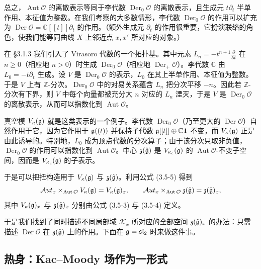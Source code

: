 总之，$\operatorname{Aut}\mathcal{O}$ 的离散表示等同于李代数 $\operatorname{Der}_0\mathcal{O}$ 的离散表示，且生成元 $t\partial_t$ 半单作用、本征值为整数。在我们考察的大多数情形，李代数 $\operatorname{Der}_0\mathcal{O}$ 的作用可以扩充为 $\operatorname{Der}\mathcal{O}=\mathbb{C}[[t]]\partial_t$ 的作用。（额外生成元 $\partial_t$ 的作用很重要，它扮演联络的角色，使我们能等同曲线 $X$ 上邻近点 $x,x'$ 所对应的对象。）

在 §3.1.3 我们引入了 Virasoro 代数的一个拓扑基。其中元素 $L_n=-t^{n+1}\frac{\partial}{\partial t}$ 在 $n\ge 0$（相应地 $n>0$）时生成 $\operatorname{Der}_0\mathcal{O}$（相应地 $\operatorname{Der}_+\mathcal{O}$）。李代数 $\mathbb{C}$ 由 $L_0=-t\partial_t$ 生成。设 $V$ 是 $\operatorname{Der}_0\mathcal{O}$ 的表示，$L_0$ 在其上半单作用、本征值为整数。于是 $V$ 上有 $\mathbb{Z}$-分次。$\operatorname{Der}_0\mathcal{O}$ 中的对易关系蕴含 $L_n$ 把分次平移 $-n$。因此若 $\mathbb{Z}$-分次有下界，则 $V$ 中每个向量都被充分大 $n$ 对应的 $L_n$ 湮灭，于是 $V$ 是 $\operatorname{Der}_0\mathcal{O}$ 的离散表示，从而可以指数化到 $\operatorname{Aut}\mathcal{O}$。

真空模 $V_\kappa(\mathfrak{g})$ 就是这类表示的一个例子。李代数 $\operatorname{Der}_0\mathcal{O}$（乃至更大的 $\operatorname{Der}\mathcal{O}$）自然作用于它，因为它作用于 $\mathfrak{g}((t))$ 并保持子代数 $\mathfrak{g}[[t]]\oplus\mathbb{C}\mathbf{1}$ 不变，而 $V_\kappa(\mathfrak{g})$ 正是由此诱导的。特别地，$L_0$ 成为顶点代数的分次算子；由于该分次只取非负值，$\operatorname{Der}_0\mathcal{O}$ 的作用可以指数化到 $\operatorname{Aut}\mathcal{O}$。中心 $\mathfrak{z}(\hat{\mathfrak{g}})$ 是 $V_{\kappa_c}(\mathfrak{g})$ 的 $\operatorname{Aut}\mathcal{O}$-不变子空间，因而是 $V_{\kappa_c}(\mathfrak{g})$ 的子表示。

于是可以把扭构造用于 $V_\kappa(\mathfrak{g})$ 与 $\mathfrak{z}(\hat{\mathfrak{g}})$。利用公式 (3.5-5) 得到
\[
    \mathcal{A}ut_x\times_{\operatorname{Aut}\mathcal{O}}V_\kappa(\mathfrak{g})=V_\kappa(\mathfrak{g})_x,
    \qquad
    \mathcal{A}ut_x\times_{\operatorname{Aut}\mathcal{O}}\mathfrak{z}(\hat{\mathfrak{g}})=\mathfrak{z}(\hat{\mathfrak{g}})_x,
\]
其中 $V_\kappa(\mathfrak{g})_x$ 与 $\mathfrak{z}(\hat{\mathfrak{g}})_x$ 分别由公式 (3.5-3) 与 (3.5-4) 定义。

于是我们找到了同时描述不同局部域 $\mathcal{K}_x$ 所对应的全部空间 $\mathfrak{z}(\hat{\mathfrak{g}})_x$ 的办法：只需描述 $\operatorname{Der}\mathcal{O}$ 在 $\mathfrak{z}(\hat{\mathfrak{g}})$ 上的作用。下面在 $\mathfrak{g}=\mathfrak{sl}_2$ 时来做这件事。

\subsection{热身：Kac–Moody 场作为一形式}

